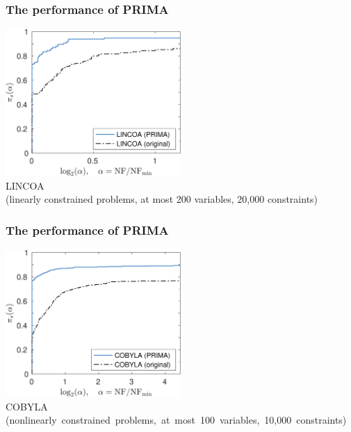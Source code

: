 \documentclass[slidestop,mathserif,xcolor=dvipsnames]{beamer}
\begin{document}
\begin{frame}
    \frametitle{The performance of PRIMA}
    \vspace{3ex}
    \begin{center}
    \includegraphics[width=0.5\textwidth]{prima_lincoa.png}
    \\[2ex]LINCOA \\[1ex](linearly constrained problems, at most 200 variables, 20,000 constraints)
    \end{center}
\end{frame}

\begin{frame}
    \frametitle{The performance of PRIMA}
    \vspace{3ex}
    \begin{center}
    \includegraphics[width=0.5\textwidth]{prima_cobyla.png}
    \\[2ex]COBYLA \\[1ex]\mbox{\!\!(nonlinearly constrained problems, at most 100 variables,
    10,000 constraints)}
    \end{center}
\end{frame}
\end{document}
